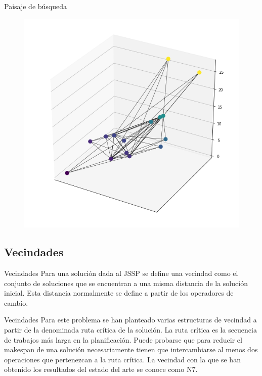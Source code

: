 \documentclass[11pt]{beamer}
\begin{document}
\begin{frame}{Paisaje de búsqueda}
\begin{figure}
\includegraphics[scale=.4]{search3.png}
\end{figure}
\end{frame}


\subsection*{Vecindades}
\begin{frame}{Vecindades}
Para una solución dada al JSSP se define una vecindad como el conjunto de soluciones que se encuentran a una misma distancia de la solución inicial. Esta distancia normalmente se define a partir de los operadores de cambio.
\end{frame}
\begin{frame}{Vecindades}
Para este problema se han planteado varias estructuras de vecindad a partir de la denominada ruta crítica de la solución. La ruta crítica es la secuencia de trabajos más larga en la planificación. Puede probarse que para reducir el makespan de una solución necesariamente tienen que intercambiarse al menos dos operaciones que pertenezcan a la ruta crítica. La vecindad con la que se han obtenido los resultados del estado del arte se conoce como N7.
\end{frame}
\end{document}
